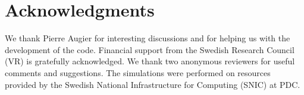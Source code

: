 
%
%

%

\section*{Acknowledgments}
We thank  Pierre Augier  for interesting discussions and for helping us with the development of the code. Financial support from the Swedish Research Council (VR) is gratefully acknowledged. We thank two anonymous reviewers for useful comments and suggestions.
The simulations were performed on resources provided by the Swedish National Infrastructure for Computing (SNIC)  at  PDC.



% 

% 
%
